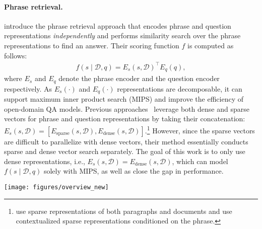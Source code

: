 \documentclass[11pt,a4paper]{article}
\newcommand{\ours}{DensePhrases}
\newcommand{\documentset}{\mathcal{D}}
\begin{document}
\paragraph{Phrase retrieval.}
\citet{seo2019real} introduce the phrase retrieval approach that encodes phrase and question representations \textit{independently} and performs similarity search over the phrase representations to find an answer.
Their scoring function $f$ is computed as follows:
\vspace{-0.5em}
\begin{equation}\label{eqn:decomp}
\begin{split}
    f(s \mid \documentset, q) = {E}_{s}(s, \documentset)^\top {E}_{q}(q),
\end{split}
\end{equation}
where $E_s$ and $E_q$ denote the phrase encoder and the question encoder respectively.
As $E_s(\cdot)$ and $E_q(\cdot)$ representations are decomposable, it can support maximum inner product search (MIPS) and improve the efficiency of open-domain QA models.
Previous approaches~\cite{seo2019real,lee2020contextualized} leverage both dense and sparse vectors for phrase and question representations by taking their concatenation: $E_{s}(s, \documentset) = [E_{\text{sparse}}(s, \documentset),  E_{\text{dense}}(s, \documentset)].$\footnote{ use sparse representations of both paragraphs and documents  and  use contextualized sparse representations conditioned on the phrase.}
However, since the sparse vectors are difficult to parallelize with dense vectors, their method  essentially conducts sparse and dense vector search separately.
The goal of this work is to only use dense representations, i.e., $E_{s}(s, \mathcal{D}) = E_{\text{dense}}(s, \mathcal{D})$, which can model $f(s \mid \mathcal{D},q)$ solely with MIPS, as well as close the gap in performance.



\begin{figure*}[t]
\begin{center}
\texttt{[image: figures/overview\_new]}
\end{center}
\caption{An overview of \ours.  (a) We learn dense phrase representations in a single passage (\S\ref{sec:single-passage}) along with in-batch and pre-batch negatives (\S\ref{sec:inbatch}, \S\ref{sec:prebatch}).
(b) With the top-$k$ retrieved phrase representations from the entire text corpus (\S\ref{sec:indexing_and_search}), we further perform query-side fine-tuning to optimize the question encoder (\S\ref{sec:qsft}).
During inference, our model simply returns the top-1 prediction.
}\label{fig:overview}
\end{figure*}
\end{document}
